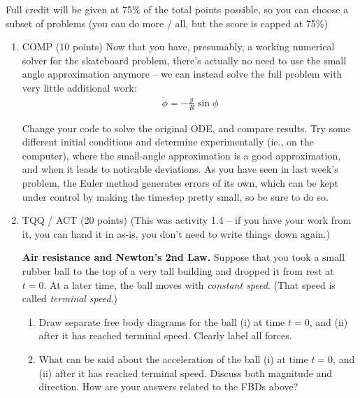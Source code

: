 \documentclass[12pt]{article}
\begin{document}
Full credit will be given at 75\% of the total points possible, so you can choose a subset of problems (you can do more / all, but the score is capped at 75\%)

\begin{enumerate}
	\item COMP (10 points) Now that you have, presumably, a working numerical solver for the skateboard problem, there's actually no need to use the small angle approximation anymore -- we can instead solve the full problem with very  little additional work:
  \begin{align}
    \ddot \phi = -\frac{g}{R} \sin \phi
  \end{align}

  Change your code to solve the original ODE, and compare results. Try some different initial conditions and determine experimentally (ie., on the computer), where the small-angle approximation is a good approximation, and when it leads to noticable deviations. As you have seen in last week's problem, the Euler method generates errors of its own, which can be kept under control by making the timestep pretty small, so be sure to do so.


\item TQQ / ACT (20 points) (This was activity 1.4 -- if you have your work from it, you can hand it in as-is, you don't need to write things down again.)

\textbf{Air resistance and Newton's 2nd Law.} Suppose that you took a small rubber ball to the top of a very tall building and dropped it from rest at $t = 0$. At a later time, the ball moves with \textit{constant speed}. (That speed is called \textit{terminal speed}.)


\begin{enumerate}
    \item

    Draw separate free body diagrams for the ball (i) at time $t = 0$, and (ii) after it has reached terminal speed. Clearly label all forces.

    \item
    What can be said about the acceleration of the ball (i) at time $t = 0$, and (ii) after it has reached terminal speed. Discuss both magnitude and direction. How are your answers related to the FBDs above?


\end{enumerate}
\end{enumerate}
\end{document}

